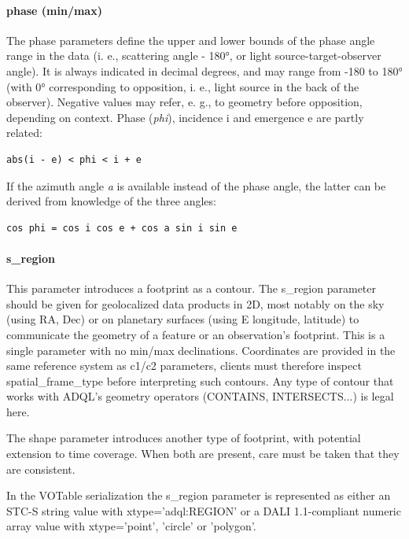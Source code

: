 \documentclass[11pt,a4paper]{ivoa}
\begin{document}
\paragraph{phase (min/max)}

The phase parameters define the upper and lower bounds of the phase angle range in the data (i. e., scattering angle - 180°, or light source-target-observer angle). It is always indicated in decimal degrees, and may range from -180 to 180° (with 0° corresponding to opposition, i. e., light source in the back of the observer). Negative values may refer, e. g., to geometry before opposition, depending on context. Phase (\emph{phi}), incidence i and emergence e are partly related:

\begin{verbatim}
abs(i - e) < phi < i + e
\end{verbatim}

If the azimuth angle \emph{a} is available instead of the phase angle, the latter can be derived from knowledge of the three angles:

\begin{verbatim}
cos phi = cos i cos e + cos a sin i sin e
\end{verbatim}

\paragraph{s\_region}

This parameter introduces a footprint as a contour. The s\_region parameter should be given for geolocalized data products in 2D, most notably on the sky (using RA, Dec) or on planetary surfaces (using E longitude, latitude) to communicate the geometry of a feature or an observation's footprint. This is a single parameter with no min/max declinations. Coordinates are provided in the same reference system as c1/c2 parameters, clients must therefore inspect spatial\_frame\_type before interpreting such contours. Any type of contour that works with ADQL's geometry operators (CONTAINS, INTERSECTS...) is legal here.

The shape parameter introduces another type of footprint, with potential extension to time coverage. When both are present, care must be taken that they are consistent.

In the VOTable serialization the s\_region parameter is represented as either an STC-S string value with xtype='adql:REGION' or a DALI 1.1-compliant numeric array value with xtype='point', 'circle' or 'polygon'.
\end{document}
